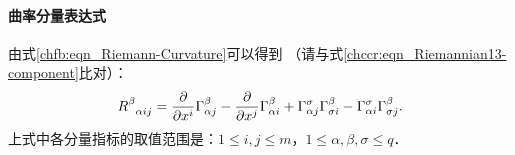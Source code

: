 \paragraph{曲率分量表达式} 由式\eqref{chfb:eqn_Riemann-Curvature}可以得到
（请与式\eqref{chccr:eqn_Riemannian13-component}比对）：
\begin{equation}\label{chfb:eqn_R-vector-bundle}
	R_{\hphantom{\alpha}\alpha i j}^\beta 
	= \frac{\partial}{\partial x^i} \Gamma_{\alpha j}^{\beta} 
	-\frac{\partial}{\partial x^j} \Gamma_{\alpha i}^{\beta}
	+\Gamma_{\alpha j}^{\sigma} \Gamma_{\sigma i}^{\beta} 
	-  \Gamma_{\alpha i}^{\sigma}\Gamma_{\sigma j}^{\beta} .   
\end{equation}
上式中各分量指标的取值范围是：$ 1\leqslant i,j \leqslant m $，$ 1\leqslant \alpha,\beta,\sigma \leqslant q$．



